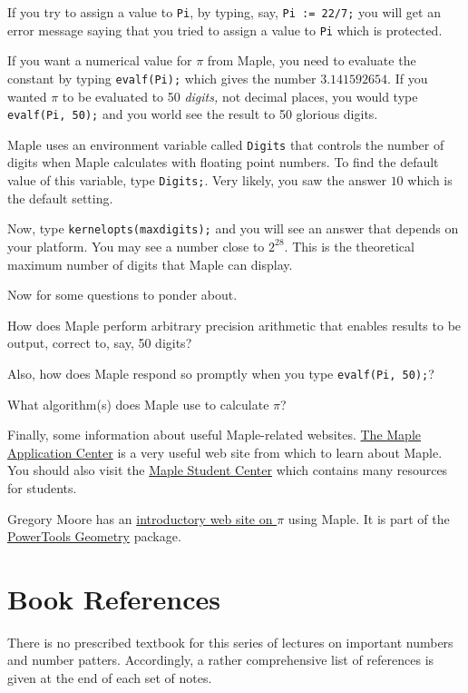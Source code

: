 \documentclass[11pt,a4paper,onecolumn]{article}
\newcommand{\map}{Maple}
\newcommand{\maps}{Maple }
\begin{document}
If you try to assign a value to \texttt{Pi}, by typing, say, \texttt{Pi := 22/7;} you will get an error message saying that you tried to assign a value to \texttt{Pi} which is protected.

If you want a numerical value for $\pi$ from \map, you need to evaluate the constant by typing \texttt{evalf(Pi);} which gives the number $3.141592654$.  If you wanted $\pi$ to be evaluated to 50 \emph{digits,} not decimal places,  you would type \texttt{evalf(Pi, 50);} and you world see the result to 50 glorious digits.

\maps uses an environment variable called \texttt{Digits} that controls the number of digits when \maps calculates with floating point numbers.  To find the default value of this variable, type \texttt{Digits;}.  Very likely, you saw the answer $10$ which is the default setting.

Now, type \texttt{kernelopts(maxdigits);} and you will see an answer
that depends on your platform.  You may see a number close to
$2^{28}$.  This is the theoretical maximum number of digits that Maple can display.

Now for some questions to ponder about.

How does \maps perform arbitrary precision arithmetic that enables
results to be output, correct to, say, 50 digits?

Also, how does \maps respond so promptly when you type
\texttt{evalf(Pi, 50);}?

What algorithm(s) does \maps use to calculate $\pi$?

Finally, some information about useful Maple-related websites.  \href{http://www.mapleapps.com/}{The Maple Application Center}  is a very useful web site from which to learn about \map.  You should also visit the \href{http://www.maple4students.com/}{Maple Student Center} which contains many resources for students.

Gregory Moore has an
\href{http://www.mapleapps.com/powertools/geom/html/Pi.html}{introductory
web site on $\pi$} using \map.  It is part of the
\href{http://www.mapleapps.com/powertools/geom/geometry.shtml}{PowerTools Geometry} package.

\section{Book References}

There is no prescribed textbook for this series of lectures on important
numbers and number patters.  Accordingly, a rather comprehensive list
of references is given at the end of each set of notes.
\end{document}
